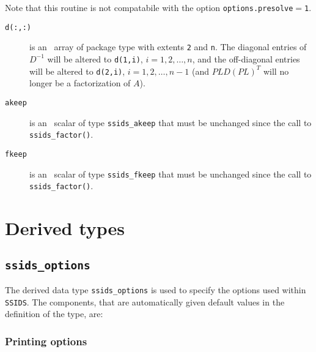 \vspace{0.3cm}
\noindent
Note that this routine is not compatabile with the option \texttt{options.presolve}$=$\texttt{1}.

\begin{description}

\item[\texttt{d(:,:)}] is an \intentin\ array of package type with
extents {\tt 2}  and {\tt n}. The diagonal entries
of ${D}^{-1}$ will be altered to {\tt d(1,i)}, $i = 1,2,\ldots,n$,
and the off-diagonal entries will be altered to
{\tt d(2,i)}, $i = 1,2,\ldots,n-1$ (and $PLD(PL)^T$ will no longer be
a factorization of $A$).

\item[\texttt{akeep}]  is an \intentin\ scalar of type {\tt ssids\_akeep} that
must be unchanged since the call to {\tt ssids\_factor()}.

\item[\texttt{fkeep}]  is an \intentinout\ scalar of type {\tt ssids\_fkeep}
that must be unchanged since the call to {\tt ssids\_factor()}.

\end{description}


\section{Derived types}
\subsection{\texttt{ssids\_options}}
\label{ssids:type:options}

The derived data type {\tt ssids\_options} is used to specify the options used
within \texttt{SSIDS}. The components, that are automatically
given default values in the definition of the type, are: \\

\subsubsection*{Printing options}

